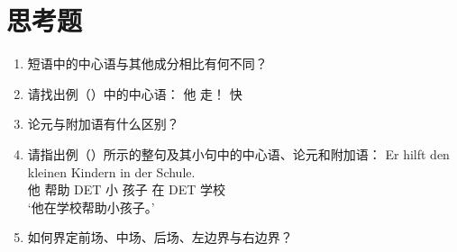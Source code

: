 



\section*{思考题}

\begin{enumerate}
\item 短语中的中心语与其他成分相比有何不同？
\item 请找出例（）中的中心语：
      \eal
      \ex 他
      \ex 走！
      \ex 快
      \zl
\item 论元与附加语有什么区别？
\item 请指出例（）所示的整句及其小句中的中心语、论元和附加语：
  \ea
	\gll Er hilft den kleinen Kindern in der Schule.\\
		 他 帮助 DET 小 孩子 在 DET 学校\\
	\glt `他在学校帮助小孩子。'
  \z

\item 如何界定前场、中场、后场、左边界与右边界？
\end{enumerate}

